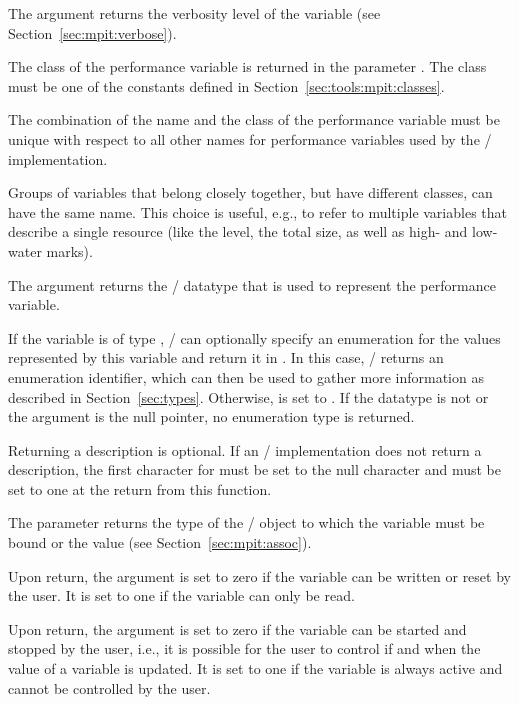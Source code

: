 The argument  returns the verbosity level of the variable
(see Section~\ref{sec:mpit:verbose}).

The class of the performance variable is returned in the parameter
.  The class must be one of the constants defined in
Section~\ref{sec:tools:mpit:classes}.

The combination of the name and the class of the performance variable must
be unique with respect to all other names for  performance variables used
by the \MPI/ implementation.

\begin{implementors}
Groups of variables that belong closely together, but have different
classes, can have the same name.  This choice is useful, e.g., to refer to
multiple variables that describe a single resource (like the level, the
total size, as well as high- and low-water marks).
\end{implementors}

The argument  returns the \MPI/ datatype that is used to
represent the performance variable.

If the variable is of type , \MPI/ can optionally specify
an enumeration for the values represented by this variable and return it in
.  In this case, \MPI/ returns an enumeration identifier,
which can then be used to gather more information as described in
Section~\ref{sec:types}.  Otherwise,  is set to
.  If the datatype is not  or the
argument  is the null pointer, no enumeration type is
returned.

Returning a description is optional.  If an \mpi/ implementation does not
return a description, the first character for  must be set to
the null character and  must be set to one at the return
from this function.

The parameter  returns the type of the \MPI/ object to which
the variable must be bound or the value 
(see Section~\ref{sec:mpit:assoc}).

Upon return, the argument  is set to zero if the variable
can be written or reset by the user.  It is set to one if the variable can
only be read.

Upon return, the argument  is set to zero if the
variable can be started and stopped by the user, i.e., it is possible for
the user to control if and when the value of a variable is updated.  It is
set to one if the variable is always active and cannot be controlled by the
user.

